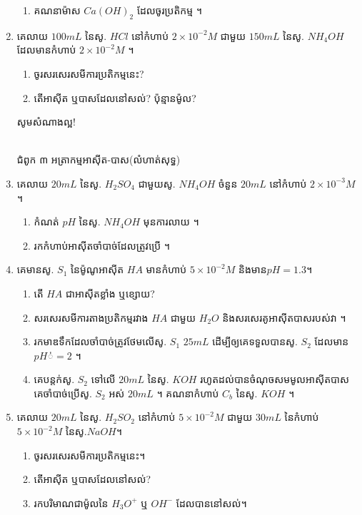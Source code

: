 \documentclass[12pt, a4paper]{article}
\begin{document}
\begin{enumerate}[m]
\begin{enumerate}[k]
		\item គណនាម៉ាស $Ca(OH)_2$ ដែលចូរប្រតិកម្ម ។
	\end{enumerate}
	\item គេលាយ $100mL$ នៃសូ. $HCl$ នៅកំហាប់ $2\times 10^{-2}M$ ជាមួយ $150mL$ នៃសូ. $NH_4OH$ ដែលមានកំហាប់ $2\times10^{-2}M$ ។
	\begin{enumerate}[k]
		\item ចូរសរសេរសមីការប្រតិកម្មនេះ?
		\item តើអាស៊ីត ឬបាសដែលនៅសល់? ប៉ុន្មានម៉ូល?
	\end{enumerate}
	\begin{center}
	\sffamily\color{black}
	សូមសំណាងល្អ!
	\end{center}\newpage
	\begin{center}
		\sffamily\color{black}
		\\
		ជំពូក ៣ អត្រាកម្មអាស៊ីត-បាស(លំហាត់សុទ្ធ)
	\end{center}
	\item គេលាយ $20mL$ នៃសូ. $H_2SO_4$ ជាមួយសូ. $NH_4OH$ ចំនួន $20mL$ នៅកំហាប់ $2\times 10^{-3}M$ ។
	\begin{enumerate}[k]
		\item កំណត់ $pH$ នៃសូ. $NH_4OH$ មុនការលាយ ។
		\item រកកំហាប់អាស៊ីតចាំបាច់ដែលត្រូវប្រើ ។
	\end{enumerate}
	\item គេមានសូ. $S_1$ នៃម៉ូណូអាស៊ីត $HA$ មានកំហាប់ $5\times 10^{-2}M$ និងមាន$pH=1.3$។
	\begin{enumerate}[k]
		\item តើ $HA$ ជាអាស៊ីតខ្លាំង ឬខ្សោយ?
		\item សរសេរសមីការតាងប្រតិកម្មរវាង $HA$ ជាមួយ $H_2O$ និងសរសេរគូអាស៊ីតបាសរបស់វា ។
		\item រកមាឌទឹកដែលចាំបាច់ត្រូវថែមលើសូ. $S_1$ $25mL$ ដើម្បីឲ្យគេទទួលបានសូ. $S_2$ ដែលមាន $pH់=2$ ។
		\item គេបន្តក់សូ. $S_2$ ទៅលើ $20mL$ នៃសូ. $KOH$ រហូតដល់បានចំណុចសមមូលអាស៊ីតបាស គេចាំបាច់ប្រើសូ. $S_2$ អស់ $20mL$ ។ គណនាកំហាប់ $C_b$ នៃសូ. $KOH$ ។
	\end{enumerate}
	\item គេលាយ $20mL$ នៃសូ. $H_2SO_2$ នៅកំហាប់ $5\times 10^{-2}M$ ជាមួយ $30mL$ នៃកំហាប់ $5\times10^{-2}M$ នៃសូ.$NaOH$។
	\begin{enumerate}[k]
		\item ចូរសរសេរសមីការប្រតិកម្មនេះ។
		\item តើអាស៊ីត ឬបាសដែលនៅសល់?
		\item រកបរិមាណជាម៉ូលនៃ $H_3O^+$ ឬ $OH^-$ ដែលបាននៅសល់។

\end{enumerate}
\end{enumerate}
\end{document}
